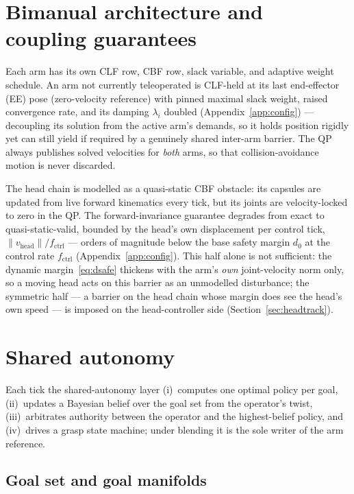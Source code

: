 \documentclass[12pt,a4paper,twoside,openright]{report}
\begin{document}
\section{Bimanual architecture and coupling guarantees}
\label{sec:bimanual}

Each arm has its own CLF row, CBF row, slack variable, and adaptive weight schedule. An arm not currently teleoperated is CLF-held at its last end-effector (EE) pose (zero-velocity reference) with pinned maximal slack weight, raised convergence rate, and its damping $\lambda_i$ doubled (Appendix~\ref{app:config}) --- decoupling its solution from the active arm's demands, so it holds position rigidly yet can still yield if required by a genuinely shared inter-arm barrier. The QP always publishes solved velocities for \emph{both} arms, so that collision-avoidance motion is never discarded.

The head chain is modelled as a quasi-static CBF obstacle: its capsules are updated from live forward kinematics every tick, but its joints are velocity-locked to zero in the QP. The forward-invariance guarantee degrades from exact to quasi-static-valid, bounded by the head's own displacement per control tick, $\|v_{\text{head}}\|/f_{\text{ctrl}}$ --- orders of magnitude below the base safety margin $d_0$ at the control rate $f_{\text{ctrl}}$ (Appendix~\ref{app:config}). This half alone is not sufficient: the dynamic margin~\eqref{eq:dsafe} thickens with the arm's \emph{own} joint-velocity norm only, so a moving head acts on this barrier as an unmodelled disturbance; the symmetric half --- a barrier on the head chain whose margin does see the head's own speed --- is imposed on the head-controller side (Section~\ref{sec:headtrack}).

\section{Shared autonomy}
\label{sec:sa}

Each tick the shared-autonomy layer (i)~computes one optimal policy per goal, (ii)~updates a Bayesian belief over the goal set from the operator's twist, (iii)~arbitrates authority between the operator and the highest-belief policy, and (iv)~drives a grasp state machine; under blending it is the sole writer of the arm reference.

\subsection{Goal set and goal manifolds}
\label{sec:policies}
\end{document}
